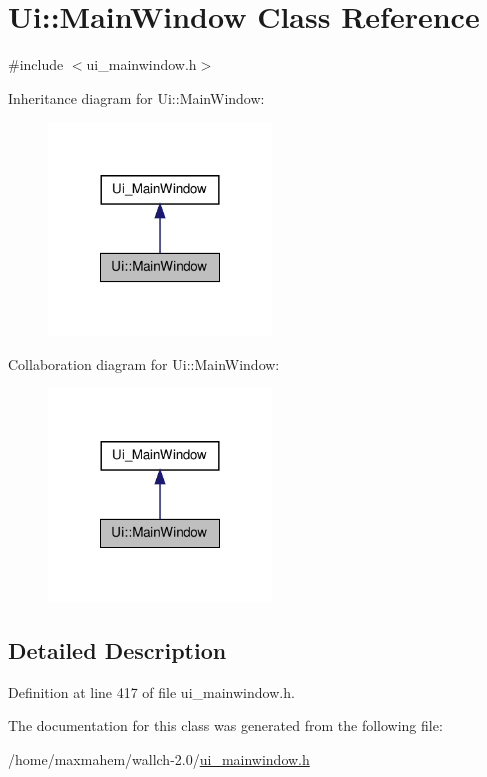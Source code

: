 \hypertarget{classUi_1_1MainWindow}{
\section{Ui::MainWindow Class Reference}
\label{classUi_1_1MainWindow}
}


{\ttfamily \#include $<$ui\_\-mainwindow.h$>$}



Inheritance diagram for Ui::MainWindow:
\nopagebreak
\begin{figure}[H]
\begin{center}
\leavevmode
\includegraphics[width=168pt]{classUi_1_1MainWindow__inherit__graph}
\end{center}
\end{figure}


Collaboration diagram for Ui::MainWindow:
\nopagebreak
\begin{figure}[H]
\begin{center}
\leavevmode
\includegraphics[width=168pt]{classUi_1_1MainWindow__coll__graph}
\end{center}
\end{figure}


\subsection{Detailed Description}


Definition at line 417 of file ui\_\-mainwindow.h.



The documentation for this class was generated from the following file:\begin{DoxyCompactItemize}
\item 
/home/maxmahem/wallch-\/2.0/\hyperlink{ui__mainwindow_8h}{ui\_\-mainwindow.h}\end{DoxyCompactItemize}
